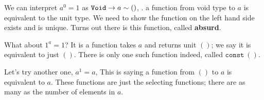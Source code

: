 We can interpret $a^0 = 1$ as $\texttt{Void} \to a \sim ()$, \ie. a function from void
type to $a$ is equivalent to the unit type. We need to show the function on the
left hand side exists and is unique. Turns out there is this function, called
\textbf{absurd}.

What about $1^a=1$? It is a function takes $a$ and returns unit $()$; we say it
is equivalent to just $()$. There is only one such function indeed, called
$\texttt{const}~()$.

Let's try another one, $a^1=a$, This is saying a function from $()$ to $a$ is
equivalent to $a$. These functions are just the selecting functions; there are
as many as the number of elements in $a$.
